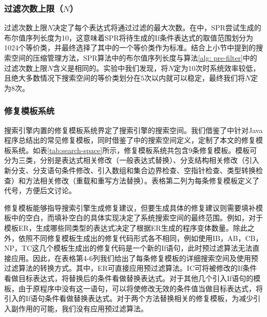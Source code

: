 \subsubsection{过滤次数上限（$N$）}

过滤次数上限$N$决定了每个表达式将通过过滤的最大次数。在\cite{Long:2015:SPR:2786805.2786811}中，SPR尝试生成的布尔值序列长度为10，这意味着SPR将待生成的If条件表达式的取值范围划分为1024个等价类，并最终选择了其中的一个等价类作为标准。结合上小节中提到的搜索空间的压缩管理方法，SPR算法中的布尔值序列长度与算法\ref{alg: pre-filter}中的过滤次数上限$N$含义是相同的。实验中我们发现，将$N$定为10次时系统效率较低，且绝大多数情况下搜索空间的等价类划分在$5$次以内就可以稳定，最终我们将$N$定为8次。


\subsubsection{修复模板系统}
搜索引擎内置的修复模板系统界定了搜索引擎的搜索空间。我们借鉴了\cite{kim2013automatic}中针对Java程序总结出的常见修复模板，同时借鉴了\cite{Long:2015:SPR:2786805.2786811}中的搜索空间定义，定制了本文的修复模板系统。如表\ref{tab:search-space}所示，修复模板系统共包含9条修复模板。模板可分为三类，分别是表达式相关修改（一般表达式替换）、分支结构相关修改（引入新分支、分支语句条件修改、引入数组和集合边界检查、空指针检查、类型转换检查）和方法相关修改（重载和重写方法替换）。表格第二列为每条修复模板定义了代号，方便后文讨论。

修复模板能够指导搜索引擎生成修复建议，但要生成具体的修复建议则需要填补模板中的空白，而填补空白的具体实现决定了系统搜索空间的最终范围。例如，对于模板ER，生成哪些同类型的表达式决定了根据ER生成的程序变体数量。除此之外，依照不同修复模板生成出的修复代码形式各不相同，例如使用IB，AB，CB，NP，TC这几个模板生成出的修复代码是一个新的If语句，此时预过滤算法无法直接应用。因此，在表格第4-6列我们给出了每条修复模板的详细搜索空间及使用预过滤算法的转换方式。其中，ER可直接应用预过滤算法。IC可将被修改的If条件看做目标表达式，将替换后的条件看做替换表达式。对于其他几个引入If语句的模板，由于原程序中没有这一语句，可以将使修改无效的条件值当做目标表达式，将引入的If语句条件看做替换表达式。对于两个方法替换相关的修复模板，为减少引入副作用的可能，我们没有应用预过滤算法。

